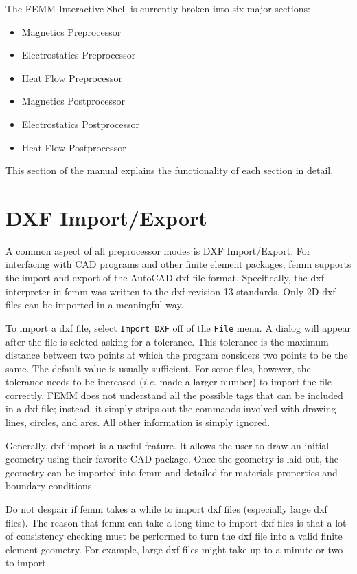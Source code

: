 \documentclass[12pt]{report}
\begin{document}
The FEMM Interactive Shell is currently broken into six major
sections:
\begin{itemize}
\item Magnetics Preprocessor
\item Electrostatics Preprocessor
\item Heat Flow Preprocessor
\item Magnetics Postprocessor
\item Electrostatics Postprocessor
\item Heat Flow Postprocessor
\end{itemize}
This section of the manual explains the functionality of each
section in detail.

\section{DXF Import/Export}

A common aspect of all preprocessor modes is DXF Import/Export. For
interfacing with CAD programs and other finite element packages,
femm supports the import and export of the AutoCAD dxf file format.
Specifically, the dxf interpreter in femm was written to the dxf
revision 13 standards. Only 2D dxf files can be imported in a
meaningful way.

To import a dxf file, select \texttt{Import DXF} off of the
\texttt{File} menu. A dialog will appear after the file is seleted
asking for a tolerance. This tolerance is the maximum distance
between two points at which the program considers two points to be
the same. The default value is usually sufficient. For some files,
however, the tolerance needs to be increased ({\em i.e.} made a
larger number) to import the file correctly. FEMM does not
understand all the possible tags that can be included in a dxf
file; instead, it simply strips out the commands involved with
drawing lines, circles, and arcs. All other information is simply
ignored.

Generally, dxf import is a useful feature. It allows the user to
draw an initial geometry using their favorite CAD package. Once the
geometry is laid out, the geometry can be imported into femm and
detailed for materials properties and boundary conditions.

Do not despair if femm takes a while to import dxf files
(especially large dxf files). The reason that femm can take a long
time to import dxf files is that a lot of consistency checking must
be performed to turn the dxf file into a valid finite element
geometry. For example, large dxf files might take up to a minute or
two to import.
\end{document}

